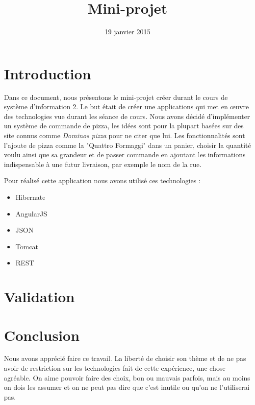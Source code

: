 \documentclass[twoside]{eiaArticle}
\title{Mini-projet }
\date{19 janvier 2015}
\author{ \eiaauthors }
\begin{document}
\eiafullpagetitlewithtocandribbon{} %

\cleardoublepage %

\section*{Introduction}
\setcounter{page}{1}
Dans ce document, nous présentons le mini-projet créer durant le cours de système d'information 2. Le but était de créer une applications qui met en œuvre des technologies vue durant les séance de cours.
Nous avons décidé d'implémenter un système de commande de pizza, les idées sont pour la plupart basées sur des site connus comme \textit{Dominos pizza} pour ne citer que lui. Les fonctionnalités sont l'ajoute de pizza comme la "Quattro Formaggi" dans un panier, choisir la quantité voulu ainsi que sa grandeur et de passer commande en ajoutant les informations indispensable à une futur livraison, par exemple le nom de la rue.

Pour réalisé cette application nous avons utilisé ces technologies :
\begin{itemize}
\item Hibernate
\item AngularJS
\item JSON
\item Tomcat
\item REST
\end{itemize}







\section{Validation}






\section*{Conclusion}
Nous avons apprécié faire ce travail. La liberté de choisir son thème et de ne pas avoir de restriction sur les technologies fait de cette expérience, une chose agréable. On aime pouvoir faire des choix, bon ou mauvais parfois, mais au moins on dois les assumer et on ne peut pas dire que c'est inutile ou qu'on ne l'utiliserai pas.
\end{document}

